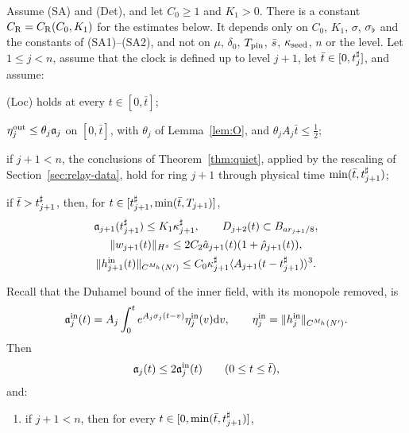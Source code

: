 \begin{proposition}
\label{prop:relay}
Assume (SA) and (Det), and let $C_0\ge1$ and $K_1>0$.
There is a constant $C_{\mathrm R}=C_{\mathrm R}(C_0,K_1)$ for the estimates below. It
depends only on $C_0$, $K_1$, $\sigma$, $\sigma_\flat$ and the constants of (SA1)--(SA2), and not
on $\mu$, $\delta_0$,
$T_{\mathrm{pin}}$, $\bar s$, $\kappa_{\mathrm{seed}}$, $n$ or the level. Let $1\le j<n$, assume that the
clock is defined up to level $j+1$, let $\bar t\in[0,t^\sharp_j]$, and assume:
\begin{description}[font=\normalfont]
\item[\textup{(H1)}] \textup{(Loc)} holds at every $t\in[0,\bar t]$;
\item[\textup{(H2)}] $\eta^{\mathrm{out}}_j\le\theta_j\mathfrak{a}_j$ on $[0,\bar t]$, with $\theta_j$ of
  Lemma~\ref{lem:O}, and $\theta_jA_j\bar t\le\frac12$;
\item[\textup{(H3)}] if $j+1<n$, the conclusions of Theorem~\ref{thm:quiet},
  applied by the rescaling of Section~\ref{sec:relay-data}, hold for ring $j+1$ through physical time
  $\min(\bar t,t^\sharp_{j+1})$;
\item[\textup{(H4)}] if $\bar t>t^\sharp_{j+1}$, then, for
  $t\in[t^\sharp_{j+1},\min(\bar t,T_{j+1})]$,
  \begin{equation}
  \label{eq:transmitted-active-data}
  \begin{gathered}
  \mathfrak{a}_{j+1}(t^\sharp_{j+1})\le K_1\kappa^\sharp_{j+1},\qquad
  D_{j+2}(t)\subset B_{ar_{j+1}/8},\\
  \|w_{j+1}(t)\|_{H^s}\le2C_2\hat a_{j+1}(t)(1+\hat\rho_{j+1}(t)),\\
  \|h^{\mathrm{in}}_{j+1}(t)\|_{C^{M_h}(N')}\le C_0\kappa^\sharp_{j+1}\langle A_{j+1}(t-t^\sharp_{j+1})\rangle^3.
  \end{gathered}
  \end{equation}
\end{description}
Recall that the Duhamel bound of the inner field, with its monopole removed, is
\begin{equation}
\label{eq:relay-inner-duhamel}
\mathfrak{a}^{\mathrm{in}}_j(t)=A_j\int_0^t
e^{A_j\sigma_j(t-v)}\eta^{\mathrm{in}}_j(v)\dd v,
\qquad \eta^{\mathrm{in}}_j=\|h^{\mathrm{in}}_j\|_{C^{M_h}(N')}.
\end{equation}
Then
\begin{equation}
\label{eq:relay-absorb}
\mathfrak{a}_j(t)\le2\mathfrak{a}^{\mathrm{in}}_j(t)\qquad(0\le t\le\bar t),
\end{equation}
and:
\begin{enumerate}[label=\textup{(\roman*)}]
\item[\textup{(o)}] if $j+1<n$, then for every $t\in[0,\min(\bar t,t^\sharp_{j+1})]$,

\end{enumerate}
\end{proposition}
